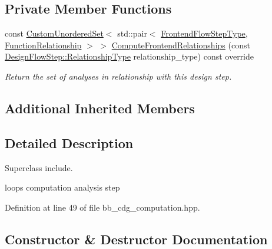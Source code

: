 \subsection*{Private Member Functions}
\begin{DoxyCompactItemize}
\item 
const \hyperlink{classCustomUnorderedSet}{Custom\+Unordered\+Set}$<$ std\+::pair$<$ \hyperlink{frontend__flow__step_8hpp_afeb3716c693d2b2e4ed3e6d04c3b63bb}{Frontend\+Flow\+Step\+Type}, \hyperlink{classFrontendFlowStep_af7cf30f2023e5b99e637dc2058289ab0}{Function\+Relationship} $>$ $>$ \hyperlink{classBBCdgComputation_af0ad1a97db94f07a681729131f821ea9}{Compute\+Frontend\+Relationships} (const \hyperlink{classDesignFlowStep_a723a3baf19ff2ceb77bc13e099d0b1b7}{Design\+Flow\+Step\+::\+Relationship\+Type} relationship\+\_\+type) const override
\begin{DoxyCompactList}\small\item\em Return the set of analyses in relationship with this design step. \end{DoxyCompactList}\end{DoxyCompactItemize}
\subsection*{Additional Inherited Members}


\subsection{Detailed Description}
Superclass include. 

loops computation analysis step 

Definition at line 49 of file bb\+\_\+cdg\+\_\+computation.\+hpp.



\subsection{Constructor \& Destructor Documentation}
\mbox{\label{classBBCdgComputation_a6f05a1ed855fe6d37f511841ff61f85e}} 
